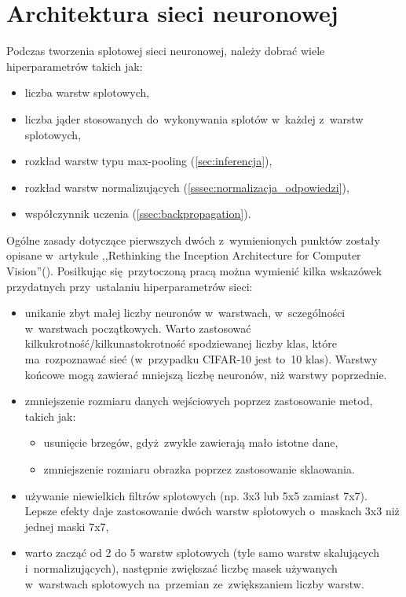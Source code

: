 \section{Architektura sieci neuronowej}
Podczas tworzenia splotowej sieci neuronowej, należy dobrać wiele hiperparametrów takich jak:
\begin{itemize}
    \item liczba warstw splotowych,
    \item liczba jąder stosowanych do~wykonywania splotów w~każdej z~warstw splotowych,
    \item rozkład warstw typu max-pooling (\ref{sec:inferencja}),
    \item rozkład warstw normalizujących (\ref{sssec:normalizacja_odpowiedzi}),
    \item współczynnik uczenia (\ref{ssec:backpropagation}).
\end{itemize}

Ogólne zasady dotyczące pierwszych dwóch z~wymienionych punktów zostały opisane w~artykule
,,Rethinking the Inception Architecture for Computer Vision''(\cite{RIACV}). Posiłkując się~przytoczoną pracą można
wymienić kilka wskazówek przydatnych przy~ustalaniu hiperparametrów sieci:
\begin{itemize}
    \item unikanie zbyt małej liczby neuronów w~warstwach, w~sczególności w~warstwach początkowych. Warto zastosować
          kilkukrotność/kilkunastokrotność spodziewanej liczby klas, które ma~rozpoznawać sieć
          (w~przypadku CIFAR-10 jest to~10 klas). Warstwy końcowe mogą zawierać mniejszą liczbę neuronów, niż warstwy
          poprzednie.
    \item zmniejszenie rozmiaru danych wejściowych poprzez zastosowanie metod, takich jak:
          \begin{itemize}
              \item usunięcie brzegów, gdyż~zwykle zawierają mało istotne dane,
              \item zmniejszenie rozmiaru obrazka poprzez zastosowanie sklaowania.
          \end{itemize}
    \item używanie niewielkich filtrów splotowych (np. 3x3 lub 5x5 zamiast 7x7). Lepsze efekty daje zastosowanie dwóch
          warstw splotowych o~maskach 3x3 niż jednej maski 7x7,
    \item warto zacząć od 2 do 5 warstw splotowych (tyle samo warstw skalujących i~normalizujących), następnie zwiększać
          liczbę masek używanych w~warstwach splotowych na~przemian ze~zwiększaniem liczby warstw.
\end{itemize}

